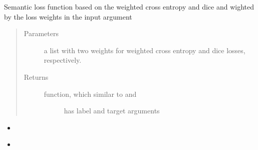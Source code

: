 \documentclass[letterpaper,10pt,english]{sphinxmanual}
\begin{document}
\begin{fulllineitems}
\label{\detokenize{index:unet.loss.multi_loss_fun}}
Semantic loss function based on the weighted cross entropy and dice and wighted by the loss weights in the input
argument
\begin{quote}\begin{description}
\item[{Parameters}] \leavevmode
{} \textendash{} a list with two weights for weighted cross entropy and dice losses, respectively.

\item[{Returns}] \leavevmode
\begin{description}
\item[{function, which similar to {\hyperref[\detokenize{index:unet.loss.weighted_cross_entropy}]{}} and {\hyperref[\detokenize{index:unet.loss.dice_loss}]{}}}] \leavevmode
has label and target arguments

\end{description}


\end{description}\end{quote}



\begin{itemize}
\item {} 
{\hyperref[\detokenize{index:unet.loss.weighted_cross_entropy}]{}}

\item {} 
{\hyperref[\detokenize{index:unet.loss.dice_loss}]{}}

\end{itemize}



\end{fulllineitems}

\end{document}
